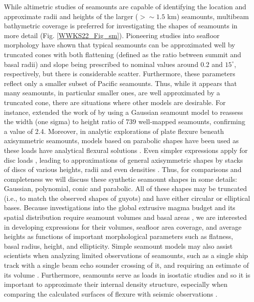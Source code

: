While altimetric studies of seamounts are capable of identifying the location and approximate radii
and heights of the larger ($> \sim 1.5$ km) seamounts, multibeam bathymetric coverage is preferred for investigating
the shapes of seamounts in more detail (Fig. \ref{WWKS22_Fig_sm}).  Pioneering studies into seafloor morphology
\citep{JMS1983,SJ1988,S1988} have shown that typical seamounts can be approximated well by truncated cones
with both flattening (defined as the ratio between summit and basal radii) and slope being prescribed
to nominal values around 0.2 and $15^\circ$, respectively, but there is considerable scatter. Furthermore,
these parameters reflect only a smaller subset of Pacific seamounts.
Thus, while it appears that many seamounts, in particular smaller ones, are well approximated by a truncated cone,
there are situations where other models are desirable.  For instance, \citet{G2022} extended the work of
\citet{S1988} by using a Gaussian seamount model to reassess the width (one sigma) to height ratio of 739
well-mapped seamounts, confirming a value of 2.4.  Moreover, in analytic explorations of plate flexure
beneath axisymmetric seamounts, models based on parabolic shapes have been used as these loads have analytical
flexural solutions \citep[e.g.,~][]{LN1980,W2001,KW2010}.  Even simpler expressions apply for disc loads
\citep{BS1969}, leading to approximations of general axisymmetric shapes by stacks of discs of various heights,
radii and even densities \citep[e.g.,~][]{HC1994}.  Thus, for comparisons and completeness we will discuss these synthetic
seamount shapes in some details: Gaussian, polynomial, conic and parabolic.  All of these shapes may be truncated
(i.e., to match the observed shapes of guyots) and have either circular or elliptical bases.  Because investigations
into the global extrusive magma budget and its spatial distribution require seamount volumes and basal areas \citep[e.g.,~][]{B1982},
we are interested in developing expressions for their volumes, seafloor area coverage, and average heights
as functions of important morphological parameters such as flatness, basal radius, height, and ellipticity.
Simple seamount models may also assist scientists when analyzing limited observations of seamounts, such as a single
ship track with a single beam echo sounder crossing of it, and requiring an estimate of its volume \citep[e.g.,~][]{HW2007}. 
Furthermore, seamounts serve as loads in isostatic studies and so it is important to approximate their internal
density structure, especially when comparing the calculated surfaces of flexure with seismic observations \citep[e.g.,~][]{W2021}.


